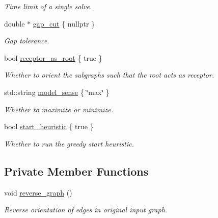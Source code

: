 \begin{DoxyCompactItemize}
\begin{DoxyCompactList}\small\item\em Time limit of a single solve. \end{DoxyCompactList}\item 
double $\ast$ \hyperlink{classderegnet_1_1DeregnetData_a3637c87366454adc152487fc2f5cfede}{gap\+\_\+cut} \{ nullptr \}
\begin{DoxyCompactList}\small\item\em Gap tolerance. \end{DoxyCompactList}\item 
bool \hyperlink{classderegnet_1_1DeregnetData_ae7936fe59661a68464134b9251303727}{receptor\+\_\+as\+\_\+root} \{ true \}
\begin{DoxyCompactList}\small\item\em Whether to orient the subgraphs such that the root acts as \textquotesingle{}receptor\textquotesingle{}. \end{DoxyCompactList}\item 
std\+::string \hyperlink{classderegnet_1_1DeregnetData_ac3918536b5423facf0ac155997703c52}{model\+\_\+sense} \{ \char`\"{}max\char`\"{} \}
\begin{DoxyCompactList}\small\item\em Whether to maximize or minimize. \end{DoxyCompactList}\item 
bool \hyperlink{classderegnet_1_1DeregnetData_abac721360704af5615f7ff84b183eebd}{start\+\_\+heuristic} \{ true \}
\begin{DoxyCompactList}\small\item\em Whether to run the greedy start heuristic. \end{DoxyCompactList}\end{DoxyCompactItemize}
\subsection*{Private Member Functions}
\begin{DoxyCompactItemize}
\item 
void \hyperlink{classderegnet_1_1DeregnetData_aa36e9ddbc2d055ac7661e74f8fa76da4}{reverse\+\_\+graph} ()
\begin{DoxyCompactList}\small\item\em Reverse orientation of edges in original input graph. \end{DoxyCompactList}\end{DoxyCompactItemize}
